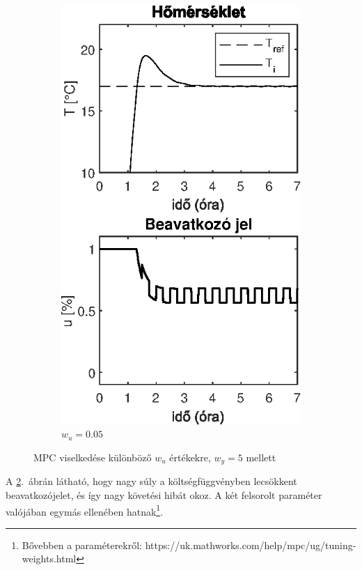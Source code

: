 \begin{figure}[H]
\begin{subfigure}[t]{0.32\textwidth}
	\includegraphics[width=\textwidth]{figures/realsys/mpc-wu-005}
	\caption{$w_u=0.05$}
	\label{fig:mpc-wu-005}
\end{subfigure}
\caption{MPC viselkedése különböző $w_u$ értékekre, $w_y=5$ mellett}
\label{fig:mpc-wu}
\end{figure}
 A \ref{fig:mpc-wu}.~ábrán látható, hogy nagy súly a költségfüggvényben lecsökkent beavatkozójelet, és így nagy követési hibát okoz. A két felsorolt paraméter valójában egymás ellenében hatnak\footnote{Bővebben a paraméterekről: https://uk.mathworks.com/help/mpc/ug/tuning-weights.html}.

